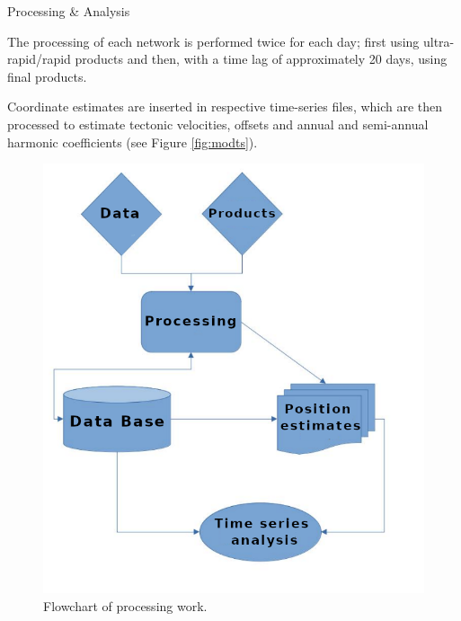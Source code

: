 \documentclass[final,a0,portrait]{beamer}
\newlength{\onecolwid}
\begin{document}
\begin{frame}[t]
\begin{columns}[t]
\begin{column}{\onecolwid}
\begin{block}{Processing \& Analysis}
{The processing of each network is performed twice for each day; first using ultra-rapid/rapid products and then, with a time 
lag of approximately 20 days, using final products. 

Coordinate estimates are inserted in respective time-series files, which are then processed to estimate tectonic velocities, 
offsets and annual and semi-annual harmonic coefficients (see Figure \ref{fig:modts}).
}

\begin{figure}
  \centering
  \includegraphics[width=0.7\onecolwid]{proc_flowchart.png}
  \caption{Flowchart of processing work.}
  \label{fig:proc}
\end{figure}
\end{block}


\end{column}
\end{columns}
\end{frame}
\end{document}
